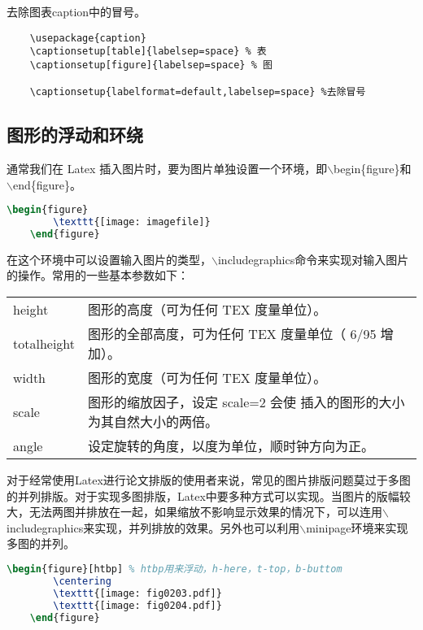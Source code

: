 \documentclass[cn,10pt,math=newtx,citestyle=gb7714-2015,bibstyle=gb7714-2015]{elegantbook}
\begin{document}
去除图表caption中的冒号。
\begin{lstlisting}
	\usepackage{caption}
	\captionsetup[table]{labelsep=space} % 表
	\captionsetup[figure]{labelsep=space} % 图
	
	\captionsetup{labelformat=default,labelsep=space} %去除冒号
\end{lstlisting}
  


\subsection{图形的浮动和环绕}

通常我们在 Latex 插入图片时，要为图片单独设置一个环境，即$\backslash$begin\{figure\}和$\backslash$end\{figure\}。
\begin{lstlisting}[language=tex]
	\begin{figure}
		\texttt{[image: imagefile]}
	\end{figure}
\end{lstlisting}

在这个环境中可以设置输入图片的类型，$\backslash$includegraphics命令来实现对输入图片的操作。常用的一些基本参数如下：

\begin{table}[h]
	\centering
	\begin{tabular}{ll}
		height &	图形的高度（可为任何 TEX 度量单位）。\\
		totalheight	& 图形的全部高度，可为任何 TEX 度量单位（ 6/95 增加）。\\
		width &	图形的宽度（可为任何 TEX 度量单位）。\\
		scale	& 图形的缩放因子，设定 scale=2 会使 插入的图形的大小为其自然大小的两倍。\\
		angle &	设定旋转的角度，以度为单位，顺时钟方向为正。\\
	\end{tabular}
\end{table}

对于经常使用Latex进行论文排版的使用者来说，常见的图片排版问题莫过于多图的并列排版。对于实现多图排版，Latex中要多种方式可以实现。当图片的版幅较大，无法两图并排放在一起，如果缩放不影响显示效果的情况下，可以连用$\backslash$includegraphics来实现，并列排放的效果。另外也可以利用$\backslash$minipage环境来实现多图的并列。

\begin{lstlisting}[language=tex]
	\begin{figure}[htbp] % htbp用来浮动，h-here，t-top，b-buttom
		\centering
		\texttt{[image: fig0203.pdf]}
		\texttt{[image: fig0204.pdf]}
	\end{figure}
\end{lstlisting}
\end{document}
